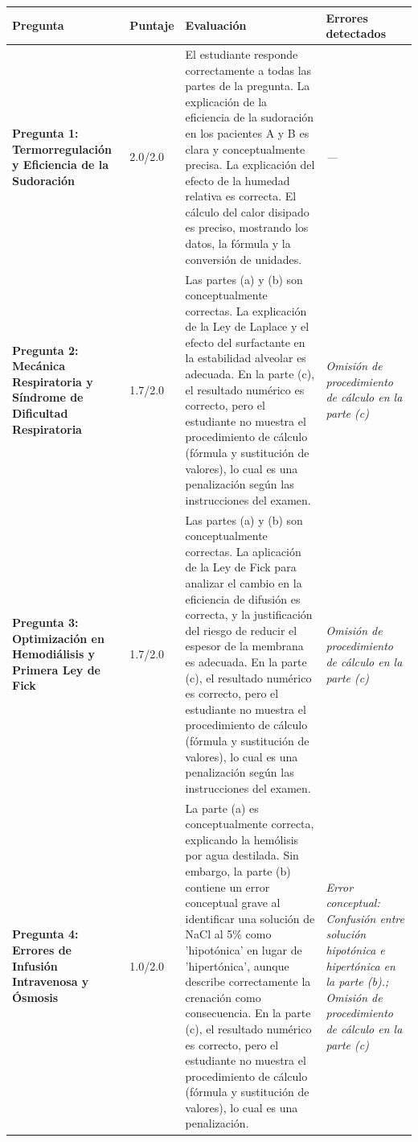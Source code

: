 \documentclass[11pt,a4paper]{article}
\begin{document}
\begin{longtable}{>{\bfseries}p{2.8cm} p{1.6cm} p{7.0cm} p{2.8cm}}
  \toprule
  \textbf{Pregunta} & \textbf{Puntaje} & \textbf{Evaluación} & \textbf{Errores detectados} \\
  \midrule
  \endhead
  \bottomrule
  \endfoot
    \textbf{Pregunta 1: Termorregulación y Eficiencia de la Sudoración} & 2.0/2.0 & El estudiante responde correctamente a todas las partes de la pregunta. La explicación de la eficiencia de la sudoración en los pacientes A y B es clara y conceptualmente precisa. La explicación del efecto de la humedad relativa es correcta. El cálculo del calor disipado es preciso, mostrando los datos, la fórmula y la conversión de unidades. & \textit{---} \\
    \midrule
    \textbf{Pregunta 2: Mecánica Respiratoria y Síndrome de Dificultad Respiratoria} & 1.7/2.0 & Las partes (a) y (b) son conceptualmente correctas. La explicación de la Ley de Laplace y el efecto del surfactante en la estabilidad alveolar es adecuada. En la parte (c), el resultado numérico es correcto, pero el estudiante no muestra el procedimiento de cálculo (fórmula y sustitución de valores), lo cual es una penalización según las instrucciones del examen. & \textit{Omisión de procedimiento de cálculo en la parte (c)} \\
    \midrule
    \textbf{Pregunta 3: Optimización en Hemodiálisis y Primera Ley de Fick} & 1.7/2.0 & Las partes (a) y (b) son conceptualmente correctas. La aplicación de la Ley de Fick para analizar el cambio en la eficiencia de difusión es correcta, y la justificación del riesgo de reducir el espesor de la membrana es adecuada. En la parte (c), el resultado numérico es correcto, pero el estudiante no muestra el procedimiento de cálculo (fórmula y sustitución de valores), lo cual es una penalización según las instrucciones del examen. & \textit{Omisión de procedimiento de cálculo en la parte (c)} \\
    \midrule
    \textbf{Pregunta 4: Errores de Infusión Intravenosa y Ósmosis} & 1.0/2.0 & La parte (a) es conceptualmente correcta, explicando la hemólisis por agua destilada. Sin embargo, la parte (b) contiene un error conceptual grave al identificar una solución de NaCl al 5\% como 'hipotónica' en lugar de 'hipertónica', aunque describe correctamente la crenación como consecuencia. En la parte (c), el resultado numérico es correcto, pero el estudiante no muestra el procedimiento de cálculo (fórmula y sustitución de valores), lo cual es una penalización. & \textit{Error conceptual: Confusión entre solución hipotónica e hipertónica en la parte (b).; Omisión de procedimiento de cálculo en la parte (c)} \\

\end{longtable}
\end{document}
